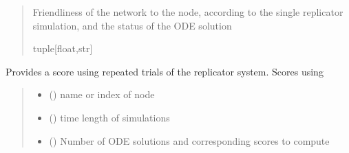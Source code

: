 \documentclass[letterpaper,10pt,english]{sphinxmanual}
\begin{document}
\begin{fulllineitems}
\begin{fulllineitems}
\begin{quote}
\begin{description}
\begin{itemize}
\end{itemize}

\sphinxAtStartPar
Friendliness of the network to the node, according to the single replicator simulation, and the status of the ODE solution

\sphinxAtStartPar
tuple{[}float,str{]}

\end{description}\end{quote}

\end{fulllineitems}


\begin{fulllineitems}
\label{\detokenize{friendlynets:friendlyNet.friendlyNet.replicator_score}}
\pysigstartsignatures
{}
\pysigstopsignatures
\sphinxAtStartPar
Provides a score using repeated trials of the replicator system. Scores using {\hyperref[\detokenize{friendlynets:friendlyNet.friendlyNet.replicator_score_single}]{}}
\begin{quote}\begin{description}
\begin{itemize}
\item {} 
\sphinxAtStartPar
{} () \textendash{} name or index of node

\item {} 
\sphinxAtStartPar
{} () \textendash{} time length of simulations

\item {} 
\sphinxAtStartPar
{} () \textendash{} Number of ODE solutions and corresponding scores to compute


\end{itemize}
\end{description}
\end{quote}
\end{fulllineitems}
\end{fulllineitems}
\end{document}

